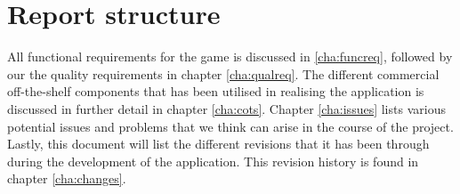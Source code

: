\section{Report structure}

All functional requirements for the game is discussed in \ref{cha:funcreq}, followed by our the quality requirements in chapter \ref{cha:qualreq}.
The different commercial off-the-shelf components that has been utilised in realising the application is discussed in further detail in chapter \ref{cha:cots}.
Chapter \ref{cha:issues} lists various potential issues and problems that we think can arise in the course of the project.
Lastly, this document will list the different revisions that it has been through during the development of the application. This revision history is found in chapter \ref{cha:changes}.
